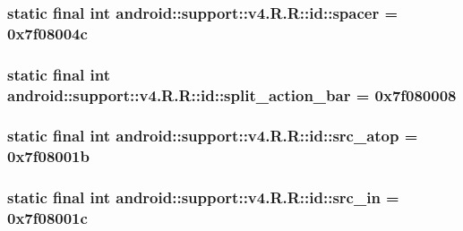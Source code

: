 \hypertarget{classandroid_1_1support_1_1v4_1_1_r_1_1id_bd42ce66a7fe9ae637e83580b1c4aa9c}{
\subsubsection[{spacer}]{\setlength{\rightskip}{0pt plus 5cm}static final int android::support::v4.R.R::id::spacer = 0x7f08004c}}
\label{classandroid_1_1support_1_1v4_1_1_r_1_1id_bd42ce66a7fe9ae637e83580b1c4aa9c}


\hypertarget{classandroid_1_1support_1_1v4_1_1_r_1_1id_764aca6e4a1a05e6911b25fb699f6018}{
\subsubsection[{split\_\-action\_\-bar}]{\setlength{\rightskip}{0pt plus 5cm}static final int android::support::v4.R.R::id::split\_\-action\_\-bar = 0x7f080008}}
\label{classandroid_1_1support_1_1v4_1_1_r_1_1id_764aca6e4a1a05e6911b25fb699f6018}


\hypertarget{classandroid_1_1support_1_1v4_1_1_r_1_1id_54f45690c0e66855e9ba475090054319}{
\subsubsection[{src\_\-atop}]{\setlength{\rightskip}{0pt plus 5cm}static final int android::support::v4.R.R::id::src\_\-atop = 0x7f08001b}}
\label{classandroid_1_1support_1_1v4_1_1_r_1_1id_54f45690c0e66855e9ba475090054319}


\hypertarget{classandroid_1_1support_1_1v4_1_1_r_1_1id_3b1fe7310813aed44e06c81032196136}{
\subsubsection[{src\_\-in}]{\setlength{\rightskip}{0pt plus 5cm}static final int android::support::v4.R.R::id::src\_\-in = 0x7f08001c}}
\label{classandroid_1_1support_1_1v4_1_1_r_1_1id_3b1fe7310813aed44e06c81032196136}



